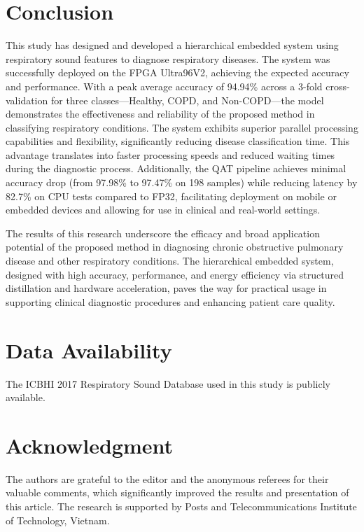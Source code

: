 \section{Conclusion}
\label{sec:conclusion}
This study has designed and developed a hierarchical embedded system using respiratory sound features to diagnose respiratory diseases. The system was successfully deployed on the FPGA Ultra96V2, achieving the expected accuracy and performance. With a peak average accuracy of 94.94\% across a 3-fold cross-validation for three classes—Healthy, COPD, and Non-COPD—the model demonstrates the effectiveness and reliability of the proposed method in classifying respiratory conditions. The system exhibits superior parallel processing capabilities and flexibility, significantly reducing disease classification time. This advantage translates into faster processing speeds and reduced waiting times during the diagnostic process. Additionally, the QAT pipeline achieves minimal accuracy drop (from 97.98\% to 97.47\% on 198 samples) while reducing latency by 82.7\% on CPU tests compared to FP32, facilitating deployment on mobile or embedded devices and allowing for use in clinical and real-world settings.

The results of this research underscore the efficacy and broad application potential of the proposed method in diagnosing chronic obstructive pulmonary disease and other respiratory conditions. The hierarchical embedded system, designed with high accuracy, performance, and energy efficiency via structured distillation and hardware acceleration, paves the way for practical usage in supporting clinical diagnostic procedures and enhancing patient care quality.

\section*{Data Availability}
The ICBHI 2017 Respiratory Sound Database used in this study is publicly available.

\section*{Acknowledgment}
The authors are grateful to the editor and the anonymous referees for their valuable comments, which significantly improved the results and presentation of this article. The research is supported by Posts and Telecommunications Institute of Technology, Vietnam.
